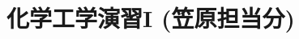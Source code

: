 \documentclass[12pt,a4]{jsbook}
\numberwithin{equation}{section}
\begin{document}
\title{化学工学演習I (笠原担当分)}
\maketitle
\tableofcontents




\end{document}
